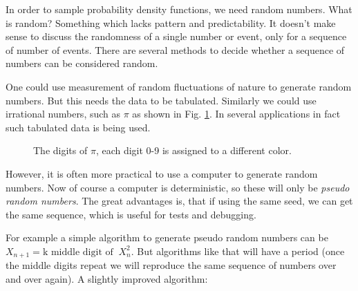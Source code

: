 In order to sample probability density functions, we need random numbers. What is random? Something which lacks pattern and predictability. It doesn't make sense to discuss the randomness of a single number or event, only for a sequence of number of events. There are several methods to decide whether a sequence of numbers can be considered random.

One could use measurement of random fluctuations of nature to generate random numbers. But this needs the data to be tabulated. Similarly we could use irrational numbers, such as $\pi$ as shown in Fig. \ref{fig:randompi}. In several applications in fact such tabulated data is being used.

\begin{figure}[ht!]
\protect {}\protect
\caption{\label{fig:randompi} \footnotesize{The digits of $\pi$, each digit 0-9 is assigned to a different color.}}
\end{figure}


However, it is often more practical to use a computer to generate random numbers. Now of course a computer is deterministic, so these will only be \textit{pseudo random numbers}. The great advantages is, that if using the same seed, we can get the same sequence, which is useful for tests and debugging. 

For example a simple algorithm to generate pseudo random numbers can be $X_{n+1}=\text{k middle digit of }\: X_n^2$. But algorithms like that will have a period (once the middle digits repeat we will reproduce the same sequence of numbers over and over again). A slightly improved algorithm:

